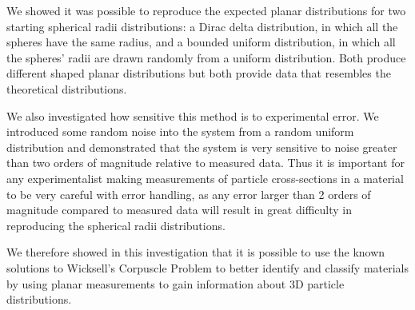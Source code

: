 \documentclass[journal]{IEEEtran}
\begin{document}
We showed it was possible to reproduce the expected planar distributions for two
starting spherical radii distributions: a Dirac delta distribution, in which all
the spheres have the same radius, and a bounded uniform distribution, in which
all the spheres' radii are drawn randomly from a uniform distribution. Both
produce different shaped planar distributions but both provide data that
resembles the theoretical distributions.

We also investigated how sensitive this method is to experimental error. We
introduced some random noise into the system from a random uniform distribution
and demonstrated that the system is very sensitive to noise greater than two
orders of magnitude relative to measured data. Thus it is important for any
experimentalist making measurements of particle cross-sections in a material to
be very careful with error handling, as any error larger than 2 orders of
magnitude compared to measured data will result in great difficulty in
reproducing the spherical radii distributions.

We therefore showed in this investigation that it is possible to use the known
solutions to Wicksell's Corpuscle Problem to better identify and classify
materials by using planar measurements to gain information about 3D particle
distributions. 

\printbibliography
\end{document}
